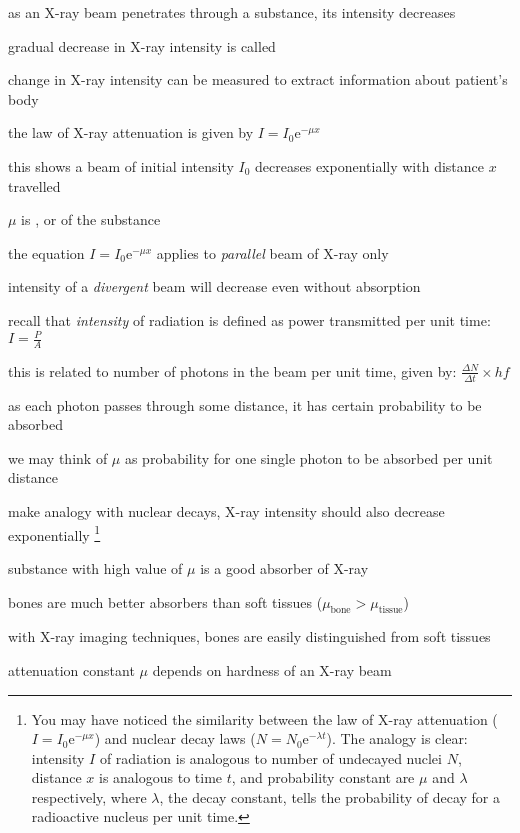 as an X-ray beam penetrates through a substance, its intensity decreases

gradual decrease in X-ray intensity is called 

change in X-ray intensity can be measured to extract information about patient's body

the law of X-ray attenuation is given by $\boxed{I = I_0 \mathrm{e}^{-\mu x}}$

this shows a beam of initial intensity $I_0$ decreases exponentially with distance $x$ travelled

$\mu$ is , or  of the substance

\cmt the equation $I = I_0 \mathrm{e}^{-\mu x}$ applies to \emph{parallel} beam of X-ray only

intensity of a \emph{divergent} beam will decrease even without absorption

\cmt recall that \emph{intensity} of radiation is defined as power transmitted per unit time: $I = \frac{P}{A}$

this is related to number of photons in the beam per unit time, given by: $\frac{\Delta N}{\Delta t} \times hf$

as each photon passes through some distance, it has certain probability to be absorbed

we may think of $\mu$ as probability for one single photon to be absorbed per unit distance

make analogy with nuclear decays, X-ray intensity should also decrease exponentially
\footnote{You may have noticed the similarity between the law of X-ray attenuation ($I = I_0 \mathrm{e}^{-\mu x}$) and nuclear decay laws ($N=N_0 \mathrm{e}^{-\lambda t}$). The analogy is clear: intensity $I$ of radiation is analogous to number of undecayed nuclei $N$, distance $x$ is analogous to time $t$, and probability constant are $\mu$ and $\lambda$ respectively, where $\lambda$, the decay constant, tells the probability of decay for a radioactive nucleus per unit time.}

\cmt substance with high value of $\mu$ is a good absorber of X-ray

bones are much better absorbers than soft tissues ($\mu_\text{bone}>\mu_\text{tissue}$)

with X-ray imaging techniques, bones are easily distinguished from soft tissues

\cmt attenuation constant $\mu$ depends on hardness of an X-ray beam

